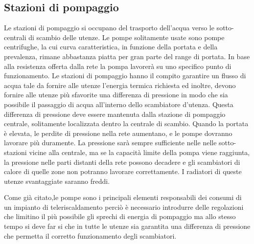 \documentclass[laurea,oneside,11pt]{USiena_tesiLM}
\begin{document}
\subsection{Stazioni di pompaggio}
Le stazioni di pompaggio si occupano del trasporto dell'acqua verso le sotto-centrali di scambio delle utenze. Le pompe solitamente usate sono pompe centrifughe, la cui curva caratteristica, in funzione della portata e della prevalenza, rimane abbastanza piatta per gran parte del range di portata. In base alla resistenza offerta dalla rete la pompa lavorerà su uno specifico punto di funzionamento. Le stazioni di pompaggio hanno il compito garantire un flusso di acqua tale da fornire alle utenze l'energia termica richiesta ed inoltre, devono fornire alle utenze più sfavorite una differenza di pressione in modo che sia possibile il passaggio di acqua all'interno dello scambiatore d'utenza.
Questa differenza di pressione deve essere mantenuta dalla stazione di pompaggio centrale, solitamente localizzata dentro la centrale di scambio. Quando la portata è elevata, le perdite di pressione nella rete aumentano, e le pompe dovranno lavorare più duramente. La pressione sarà sempre sufficiente nelle nelle sotto-stazioni vicine alla centrale, ma se la capacità limite della pompa viene raggiunta, la pressione nelle parti distanti della rete  possono decadere e gli scambiatori di calore di quelle zone non potranno lavorare correttamente. I radiatori di queste utenze svantaggiate saranno freddi.

Come già citato,le pompe sono i principali elementi responsabili dei consumi di un impianto di teleriscaldamento perciò è necessario introdurre delle regolazioni che limitino il più possibile gli sprechi di energia di pompaggio ma allo stesso tempo si deve far si che in tutte le utenze sia garantita una differenza di pressione che permetta il corretto funzionamento degli scambiatori. 
\end{document}
